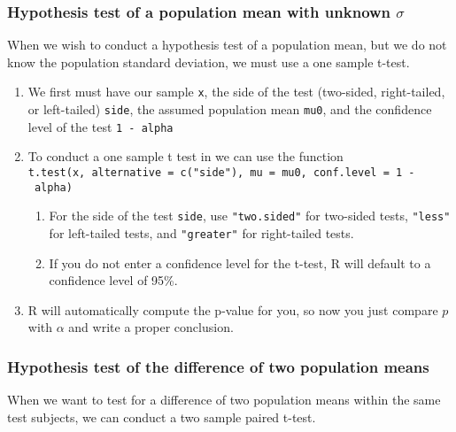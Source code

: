 \hypertarget{hypothesis-test-of-a-population-mean-with-unknown-sigma}{%
\subsubsection{\texorpdfstring{Hypothesis test of a population mean with
unknown
\(\sigma\)}{Hypothesis test of a population mean with unknown \textbackslash sigma}}\label{hypothesis-test-of-a-population-mean-with-unknown-sigma}}

When we wish to conduct a hypothesis test of a population mean, but we
do not know the population standard deviation, we must use a one sample
t-test.

\begin{enumerate}
\def\labelenumi{\arabic{enumi}.}
\item
  We first must have our sample \texttt{x}, the side of the test
  (two-sided, right-tailed, or left-tailed) \texttt{side}, the assumed
  population mean \texttt{mu0}, and the confidence level of the test
  \texttt{1\ -\ alpha}
\item
  To conduct a one sample t test in we can use the function
  \texttt{t.test(x,\ alternative\ =\ c("side"),\ mu\ =\ mu0,\ conf.level\ =\ 1\ -\ alpha)}

  \begin{enumerate}
  \def\labelenumii{\alph{enumii}.}
  \item
    For the side of the test \texttt{side}, use \texttt{"two.sided"} for
    two-sided tests, \texttt{"less"} for left-tailed tests, and
    \texttt{"greater"} for right-tailed tests.
  \item
    If you do not enter a confidence level for the t-test, R will
    default to a confidence level of 95\%.
  \end{enumerate}
\item
  R will automatically compute the p-value for you, so now you just
  compare \(p\) with \(\alpha\) and write a proper conclusion.
\end{enumerate}

\hypertarget{hypothesis-test-of-the-difference-of-two-population-means}{%
\subsubsection{Hypothesis test of the difference of two population
means}\label{hypothesis-test-of-the-difference-of-two-population-means}}

When we want to test for a difference of two population means within the
same test subjects, we can conduct a two sample paired t-test.

